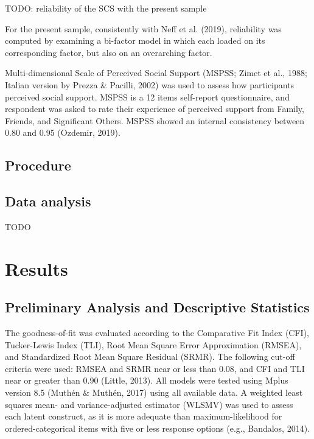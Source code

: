 \documentclass[
  english,
  man,floatsintext]{apa7}
\begin{document}
TODO: reliability of the SCS with the present sample

For the present sample, consistently with Neff et al. (2019), reliability was computed by examining a bi-factor model in which each loaded on its corresponding factor, but also on an overarching factor.

Multi-dimensional Scale of Perceived Social Support (MSPSS; Zimet et al., 1988; Italian version by Prezza \& Pacilli, 2002) was used to assess how participants perceived social support.
MSPSS is a 12 items self-report questionnaire, and respondent was asked to rate their experience of perceived support from Family, Friends, and Significant Others.
MSPSS showed an internal consistency between 0.80 and 0.95 (Ozdemir, 2019).

\hypertarget{procedure}{%
\subsection{Procedure}\label{procedure}}

\hypertarget{data-analysis}{%
\subsection{Data analysis}\label{data-analysis}}

TODO

\hypertarget{results}{%
\section{Results}\label{results}}

\hypertarget{preliminary-analysis-and-descriptive-statistics}{%
\subsection{Preliminary Analysis and Descriptive Statistics}\label{preliminary-analysis-and-descriptive-statistics}}

The goodness‐of‐fit was evaluated according to the Comparative Fit Index (CFI), Tucker-Lewis Index (TLI), Root Mean Square Error Approximation (RMSEA), and Standardized Root Mean Square Residual (SRMR).
The following cut-off criteria were used: RMSEA and SRMR near or less than 0.08, and CFI and TLI near or greater than 0.90 (Little, 2013).
All models were tested using Mplus version 8.5 (Muthén \& Muthén, 2017) using all available data.
A weighted least squares mean- and variance-adjusted estimator (WLSMV) was used to assess each latent construct, as it is more adequate than maximum-likelihood for ordered-categorical items with five or less response options (e.g., Bandalos, 2014).
\end{document}
